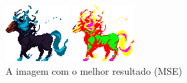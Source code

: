\begin{figure}[h!]
	\caption{A imagem com o melhor resultado (MSE)}
    \label{fig:bestmse}
    \centering
    \begin{minipage}[b]{0.25\textwidth}
        \includegraphics[width=\textwidth]{imagens/nightmare-idle.png}
    \end{minipage}
    \hfill
    \begin{minipage}[b]{0.25\textwidth}
        \includegraphics[width=\textwidth]{imagens/nightmare-idle-v2.png}

\end{minipage}
\end{figure}
